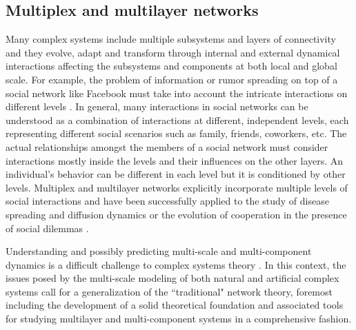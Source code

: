 		\subsection{Multiplex and multilayer networks} \label{sec:multiplex}
			Many complex systems include multiple subsystems and layers of connectivity and they evolve, adapt and transform through internal and external dynamical interactions affecting the subsystems and components at both local and global scale. For example, the problem of information or rumor spreading on top of a social network like Facebook must take into account the intricate interactions on different levels \cite{Boccaletti2014}. In general, many interactions in social networks can be understood as a combination of interactions at different, independent levels, each representing different social scenarios such as family, friends, coworkers, etc. The actual relationships amongst the members of a social network must consider interactions mostly inside the levels and their influences on the other layers. An individual's behavior can be different in each level but it is conditioned by other levels. Multiplex and multilayer networks explicitly incorporate multiple levels of social interactions and have been successfully applied to the study of disease spreading and diffusion dynamics \cite{Gomez2013,Granell2013} or the evolution of cooperation in the presence of social dilemmas  \cite{Matamalas2015}. 
			
			Understanding and possibly predicting multi-scale and multi-component dynamics is a difficult challenge to complex systems theory \cite{Boccaletti2014}. In this context, the issues posed by the multi-scale modeling of both natural and artificial complex systems call for a generalization of the ``traditional" network theory, foremost including the development of a solid theoretical foundation and associated tools for studying multilayer and multi-component systems in a comprehensive fashion. 
		
